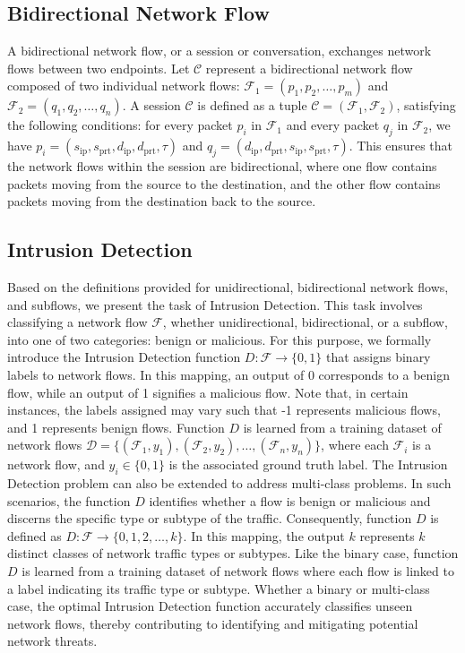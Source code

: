 \documentclass[lettersize,journal]{IEEEtran}
\begin{document}
\subsection{Bidirectional Network Flow}\label{sec:bidirectional_flow}
A bidirectional network flow, or a session or conversation, exchanges network flows between two endpoints. Let $\mathcal{C}$ represent a bidirectional network flow composed of two individual network flows: $\mathcal{F}_1 = (p_1, p_2, \dots, p_m)$ and $\mathcal{F}_2 = (q_1, q_2, \dots, q_n)$. A session $\mathcal{C}$ is defined as a tuple $\mathcal{C} = (\mathcal{F}_1, \mathcal{F}_2)$, satisfying the following conditions: for every packet $p_i$ in $\mathcal{F}_1$ and every packet $q_j$ in $\mathcal{F}_2$, we have $p_i = (s_{\text{ip}}, s_{\text{prt}}, d_{\text{ip}}, d_{\text{prt}}, \tau)$ and $q_j = (d_{\text{ip}}, d_{\text{prt}}, s_{\text{ip}}, s_{\text{prt}}, \tau)$. This ensures that the network flows within the session are bidirectional, where one flow contains packets moving from the source to the destination, and the other flow contains packets moving from the destination back to the source.
 
\subsection{Intrusion Detection} 
Based on the definitions provided for unidirectional, bidirectional network flows, and subflows, we present the task of Intrusion Detection. This task involves classifying a network flow $\mathcal{F}$, whether unidirectional, bidirectional, or a subflow, into one of two categories: benign or malicious. For this purpose, we formally introduce the Intrusion Detection function $D: \mathcal{F} \rightarrow \{0, 1\}$ that assigns binary labels to network flows. In this mapping, an output of 0 corresponds to a benign flow, while an output of 1 signifies a malicious flow. Note that, in certain instances, the labels assigned may vary such that -1 represents malicious flows, and 1 represents benign flows. Function $D$ is learned from a training dataset of network flows $\mathcal{D} = \{(\mathcal{F}_1, y_1), (\mathcal{F}_2, y_2), \ldots, (\mathcal{F}_n, y_n)\}$, where each $\mathcal{F}_i$ is a network flow, and $y_i \in \{0, 1\}$ is the associated ground truth label. The Intrusion Detection problem can also be extended to address multi-class problems. In such scenarios, the function $D$ identifies whether a flow is benign or malicious and discerns the specific type or subtype of the traffic. Consequently, function $D$ is defined as $D: \mathcal{F} \rightarrow \{0, 1, 2, \ldots, k\}$. In this mapping, the output $k$ represents $k$ distinct classes of network traffic types or subtypes. Like the binary case, function $D$ is learned from a training dataset of network flows where each flow is linked to a label indicating its traffic type or subtype. Whether a binary or multi-class case, the optimal Intrusion Detection function accurately classifies unseen network flows, thereby contributing to identifying and mitigating potential network threats.
 
\end{document}
